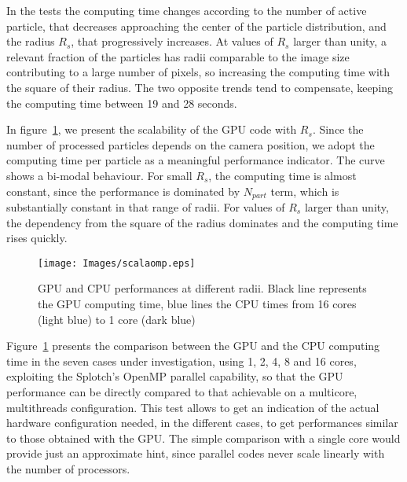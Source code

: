 \documentclass[11pt]{article}
\begin{document}
In the tests the computing time changes according
to the number of active particle, that decreases approaching the center of the particle 
distribution, and the radius $R_s$, that progressively increases. At values of 
$R_s$ larger than unity, a relevant fraction of the particles has radii comparable to the image size
contributing to a large number of pixels, so increasing the computing time 
with the square of their radius. The two opposite trends tend to compensate, keeping  
the computing time between 19 and 28 seconds.


In figure~\ref{fig:gpucpu}, we present the scalability of the GPU code 
with $R_s$. Since the number of processed particles depends on
the camera position, we adopt the  
computing time per particle as a meaningful performance
indicator. The curve shows a bi-modal behaviour. For small $R_s$,
the computing time is almost constant, since the performance is dominated
by $N_{part}$ term, which is substantially constant in that range of 
radii. For values of $R_s$ larger 
than unity, the dependency from the square of the radius dominates and the computing time 
rises quickly. 

\begin{figure}
\centering
\texttt{[image: Images/scalaomp.eps]}
\caption{GPU and CPU performances at different radii. Black line represents the GPU 
computing time, blue lines the CPU times from 16 cores (light blue) to 1 core
(dark blue)}
\label{fig:gpucpu}
\end{figure}

Figure~\ref{fig:gpucpu} presents the comparison between the GPU and the CPU computing time
in the seven cases under investigation, using 
1, 2, 4, 8 and 16 cores, exploiting the Splotch's OpenMP \cite{openmpurl} parallel
capability, so that the GPU performance can be directly compared to
that achievable on a multicore, multithreads configuration.
This test allows to get an indication of the actual hardware configuration
needed, in the different cases, to get performances similar to those
obtained with the GPU. The simple comparison with a single core would provide 
just an approximate hint, since parallel codes never scale linearly with
the number of processors. 
\end{document}
